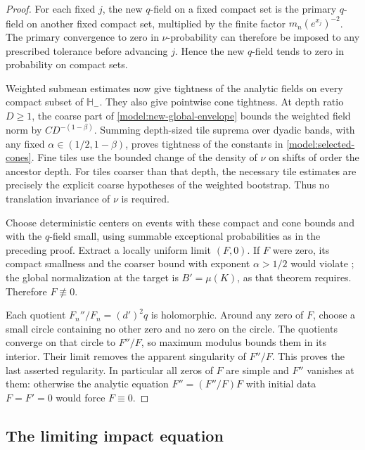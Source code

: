 \begin{proof}
For each fixed \(j\), the new \(q\)-field on a fixed compact set is
the primary \(q\)-field on another fixed compact set, multiplied by
the finite factor \(m_n(e^{x_j})^{-2}\).  The primary convergence
to zero in \(\nu\)-probability can therefore be imposed to any
prescribed tolerance before advancing \(j\).  Hence the new
\(q\)-field tends to zero in probability on compact sets.

Weighted submean estimates now give tightness of the analytic fields
on every compact subset of \(\mathbb H_-\).  They also give
pointwise cone tightness.  At depth ratio \(D\ge1\), the coarse
part of \eqref{model:new-global-envelope} bounds the weighted
field norm by \(CD^{-(1-\beta)}\).  Summing depth-sized tile
suprema over dyadic bands, with any fixed
\(\alpha\in(1/2,1-\beta)\), proves tightness of the constants in
\eqref{model:selected-cones}.  Fine tiles use the bounded change of
the density of \(\nu\) on shifts of order the ancestor depth.
For tiles coarser than that depth, the necessary tile estimates
are precisely the explicit coarse hypotheses of the weighted
bootstrap.  Thus no translation invariance of \(\nu\) is required.

Choose deterministic centers on events with these compact and cone
bounds and with the \(q\)-field small, using summable exceptional
probabilities as in the preceding proof.  Extract a locally
uniform limit \((F,0)\).  If \(F\) were zero, its compact
smallness and the coarser bound with exponent \(\alpha>1/2\)
would violate ; the global
normalization at the target is \(B'=\mu(K)\), as that theorem
requires.  Therefore \(F\not\equiv0\).

Each quotient \(F_n''/F_n=(d')^2q\) is holomorphic.  Around any
zero of \(F\), choose a small circle containing no other zero and
no zero on the circle.  The quotients converge on that circle to
\(F''/F\), so maximum modulus bounds them in its interior.
Their limit removes the apparent singularity of \(F''/F\).
This proves the last asserted regularity.  In particular all zeros
of \(F\) are simple and \(F''\) vanishes at them: otherwise the
analytic equation \(F''=(F''/F)F\) with initial data
\(F=F'=0\) would force \(F\equiv0\).
\end{proof}

\subsection{The limiting impact equation}
\label{model:equation-subsection}

